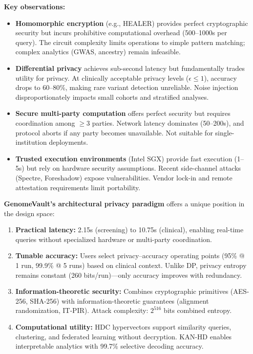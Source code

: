 \documentclass[12pt,a4paper]{article}
\begin{document}
\textbf{Key observations:}
\begin{itemize}
\item \textbf{Homomorphic encryption} (e.g., HEALER) provides perfect cryptographic security but incurs prohibitive computational overhead (500--1000s per query). The circuit complexity limits operations to simple pattern matching; complex analytics (GWAS, ancestry) remain infeasible.
\item \textbf{Differential privacy} achieves sub-second latency but fundamentally trades utility for privacy. At clinically acceptable privacy levels ($\epsilon \leq 1$), accuracy drops to 60--80\%, making rare variant detection unreliable. Noise injection disproportionately impacts small cohorts and stratified analyses.
\item \textbf{Secure multi-party computation} offers perfect security but requires coordination among $\geq$3 parties. Network latency dominates (50--200s), and protocol aborts if any party becomes unavailable. Not suitable for single-institution deployments.
\item \textbf{Trusted execution environments} (Intel SGX) provide fast execution (1--5s) but rely on hardware security assumptions. Recent side-channel attacks (Spectre, Foreshadow) expose vulnerabilities. Vendor lock-in and remote attestation requirements limit portability.
\end{itemize}

\textbf{GenomeVault's architectural privacy paradigm} offers a unique position in the design space:
\begin{enumerate}
\item \textbf{Practical latency:} 2.15s (screening) to 10.75s (clinical), enabling real-time queries without specialized hardware or multi-party coordination.
\item \textbf{Tunable accuracy:} Users select privacy--accuracy operating points (95\% @ 1 run, 99.9\% @ 5 runs) based on clinical context. Unlike DP, privacy entropy remains constant (260 bits/run)---only accuracy improves with redundancy.
\item \textbf{Information-theoretic security:} Combines cryptographic primitives (AES-256, SHA-256) with information-theoretic guarantees (alignment randomization, IT-PIR). Attack complexity: $2^{516}$ bits combined entropy.
\item \textbf{Computational utility:} HDC hypervectors support similarity queries, clustering, and federated learning without decryption. KAN-HD enables interpretable analytics with 99.7\% selective decoding accuracy.
\end{enumerate}
\end{document}
